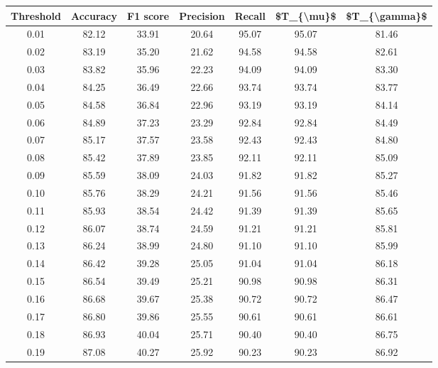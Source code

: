 \begin{tabular}{|c|c|c|c|c|c|c|}
\hline
 Threshold &  Accuracy &  F1 score &  Precision &  Recall &  \$T\_\{\textbackslash mu\}\$ &  \$T\_\{\textbackslash gamma\}\$ \\
\hline
      0.01 &     82.12 &     33.91 &      20.64 &   95.07 &      95.07 &         81.46 \\
      0.02 &     83.19 &     35.20 &      21.62 &   94.58 &      94.58 &         82.61 \\
      0.03 &     83.82 &     35.96 &      22.23 &   94.09 &      94.09 &         83.30 \\
      0.04 &     84.25 &     36.49 &      22.66 &   93.74 &      93.74 &         83.77 \\
      0.05 &     84.58 &     36.84 &      22.96 &   93.19 &      93.19 &         84.14 \\
      0.06 &     84.89 &     37.23 &      23.29 &   92.84 &      92.84 &         84.49 \\
      0.07 &     85.17 &     37.57 &      23.58 &   92.43 &      92.43 &         84.80 \\
      0.08 &     85.42 &     37.89 &      23.85 &   92.11 &      92.11 &         85.09 \\
      0.09 &     85.59 &     38.09 &      24.03 &   91.82 &      91.82 &         85.27 \\
      0.10 &     85.76 &     38.29 &      24.21 &   91.56 &      91.56 &         85.46 \\
      0.11 &     85.93 &     38.54 &      24.42 &   91.39 &      91.39 &         85.65 \\
      0.12 &     86.07 &     38.74 &      24.59 &   91.21 &      91.21 &         85.81 \\
      0.13 &     86.24 &     38.99 &      24.80 &   91.10 &      91.10 &         85.99 \\
      0.14 &     86.42 &     39.28 &      25.05 &   91.04 &      91.04 &         86.18 \\
      0.15 &     86.54 &     39.49 &      25.21 &   90.98 &      90.98 &         86.31 \\
      0.16 &     86.68 &     39.67 &      25.38 &   90.72 &      90.72 &         86.47 \\
      0.17 &     86.80 &     39.86 &      25.55 &   90.61 &      90.61 &         86.61 \\
      0.18 &     86.93 &     40.04 &      25.71 &   90.40 &      90.40 &         86.75 \\
      0.19 &     87.08 &     40.27 &      25.92 &   90.23 &      90.23 &         86.92 \\

\end{tabular}
